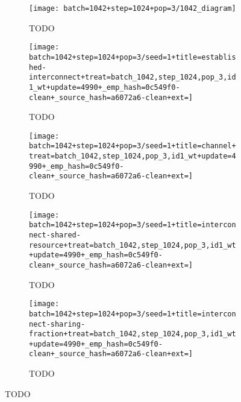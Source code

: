 \begin{figure}[!htbp]
\begin{center}
\begin{subfigure}[b]{\linewidth}
  \texttt{[image: batch=1042+step=1024+pop=3/1042\_diagram]}
  \caption{TODO}
  \label{fig:TODO}
\end{subfigure}
\begin{subfigure}[b]{0.33\linewidth}

  \texttt{[image: batch=1042+step=1024+pop=3/seed=1+title=established-interconnect+treat=batch\_1042,step\_1024,pop\_3,id1\_wt+update=4990+\_emp\_hash=0c549f0-clean+\_source\_hash=a6072a6-clean+ext=]}
  \caption{TODO}
  \label{fig:TODO}
\end{subfigure}
\begin{subfigure}[b]{0.33\linewidth}
  \texttt{[image: batch=1042+step=1024+pop=3/seed=1+title=channel+treat=batch\_1042,step\_1024,pop\_3,id1\_wt+update=4990+\_emp\_hash=0c549f0-clean+\_source\_hash=a6072a6-clean+ext=]}
  \caption{TODO}
  \label{fig:TODO}
\end{subfigure}
\begin{subfigure}[b]{0.33\linewidth}
  \texttt{[image: batch=1042+step=1024+pop=3/seed=1+title=interconnect-shared-resource+treat=batch\_1042,step\_1024,pop\_3,id1\_wt+update=4990+\_emp\_hash=0c549f0-clean+\_source\_hash=a6072a6-clean+ext=]}
  \caption{TODO}
  \label{fig:TODO}
\end{subfigure}
\begin{subfigure}[b]{0.33\linewidth}
  \texttt{[image: batch=1042+step=1024+pop=3/seed=1+title=interconnect-sharing-fraction+treat=batch\_1042,step\_1024,pop\_3,id1\_wt+update=4990+\_emp\_hash=0c549f0-clean+\_source\_hash=a6072a6-clean+ext=]}
  \caption{TODO}
  \label{fig:TODO}
\end{subfigure}
\caption{
TODO
}
\label{fig:case_study_1042}
\end{center}
\end{figure}
